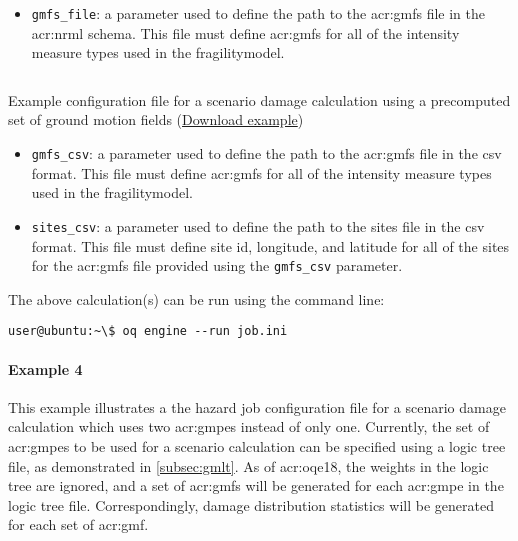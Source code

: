 \begin{itemize}

  \item \Verb+gmfs_file+: a parameter used to define the path
    to the \glspl{acr:gmf} file in the \gls{acr:nrml} schema. This file must
    define \glspl{acr:gmf} for all of the intensity measure types used in the
    \gls{fragilitymodel}.

\end{itemize}

\begin{listing}[htbp]
  \inputminted[firstline=1,firstnumber=1,fontsize=\footnotesize,frame=single,linenos,bgcolor=lightgray,label=job.ini]{ini}{oqum/risk/verbatim/config_scenario_damage_gmf_csv.ini}
  \caption{Example configuration file for a scenario damage calculation using a precomputed set of ground motion fields (\href{https://raw.githubusercontent.com/gem/oq-engine/master/doc/manual/oqum/risk/verbatim/config_scenario_damage_gmf_csv.ini}{Download example})}
  \label{lst:config_scenario_damage_gmf_csv}
\end{listing}

\begin{itemize}

  \item \Verb+gmfs_csv+: a parameter used to define the path
    to the \glspl{acr:gmf} file in the csv format. This file must
    define \glspl{acr:gmf} for all of the intensity measure types used in the
    \gls{fragilitymodel}.

  \item \Verb+sites_csv+: a parameter used to define the path
    to the sites file in the csv format. This file must
    define site id, longitude, and latitude for all of the sites for the
    \glspl{acr:gmf} file provided using the \Verb+gmfs_csv+ parameter.

\end{itemize}

The above calculation(s) can be run using the command line:

\begin{verbatim}
user@ubuntu:~\$ oq engine --run job.ini
\end{verbatim}


\paragraph{Example 4}

This example illustrates a the hazard job configuration file for a scenario
damage calculation which uses two \glspl{acr:gmpe} instead of only one.
Currently, the set of \glspl{acr:gmpe} to be used for a scenario calculation
can be specified using a logic tree file, as demonstrated in
\ref{subsec:gmlt}. As of \glsdesc{acr:oqe18}, the weights in the logic tree
are ignored, and a set of \glspl{acr:gmf} will be generated for each
\gls{acr:gmpe} in the logic tree file. Correspondingly, damage distribution
statistics will be generated for each set of \gls{acr:gmf}.

